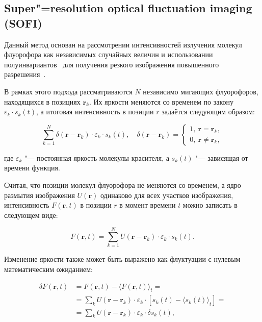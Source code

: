 \subsection{Super"=resolution optical fluctuation imaging (SOFI)}

Данный метод основан на рассмотрении интенсивностей излучения молекул флуорофора как независимых случайных величин и использовании полуинвариантов~\cite{75086} для получения резкого изображения повышенного разрешения~\cite{dertinger2009fast,dertinger2010achieving}.

В рамках этого подхода рассматриваются $N$ независимо мигающих флуорофоров, находящихся в позициях $\mathbf{r}_k$. Их яркости меняются со временем по закону $\varepsilon_k\cdot s_k(t)$, а итоговая интенсивность в позиции $r$ задаётся следующим образом:

\begin{equation}
	\sum_{k=1}^{N}{\delta(\mathbf{r}-\mathbf{r}_k)\cdot\varepsilon_k\cdot s_k(t)}, \quad \delta\left(\mathbf{r}-\mathbf{r}_k\right)=
	\begin{cases}
		1,\ \mathbf{r}=\mathbf{r}_k, \\
		0,\ \mathbf{r}\neq\mathbf{r}_k,
	\end{cases} \nonumber
\end{equation}	

\noindent где $\varepsilon_k$ "--- постоянная яркость молекулы красителя, а $s_k(t)$ "--- зависящая от времени функция.

Считая, что позиции молекул флуорофора не меняются со временем, а ядро размытия изображения $U(\mathbf{r})$ одинаково для всех участков изображения, интенсивность $F(\mathbf{r},t)$ в позиции $r$ в момент времени $t$ можно записать в следующем виде:

\begin{equation}
	F\left(\mathbf{r},t\right)=\sum_{k=1}^{N}{U(\mathbf{r}-\mathbf{r}_k)\cdot\varepsilon_k\cdot s_k(t)}. \nonumber
\end{equation}

Изменение яркости также может быть выражено как флуктуации с нулевым математическим ожиданием:

\begin{align*}
	\delta F\left(\mathbf{r},t\right) &= F\left(\mathbf{r},t\right)-\langle F\left(\mathbf{r},t\right) \rangle_t = \\
	&= \sum_{k} {U\left(\mathbf{r} - \mathbf{r}_k\right) \cdot \varepsilon_k \cdot \left[ s_k\left(t\right)- \langle s_k\left(t\right) \rangle_t \right]} = \\
	&= \sum_{k} {U\left(\mathbf{r} - \mathbf{r}_k\right) \cdot \varepsilon_k \cdot \delta s_k \left(t\right)},
\end{align*}

